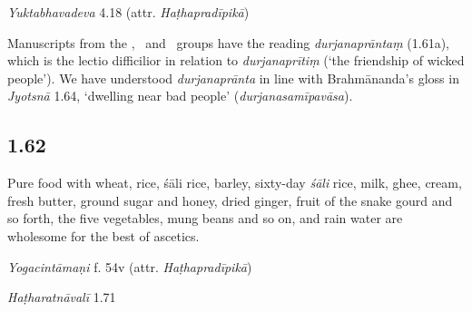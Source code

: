 \begin{ekdosis}
\begin{testimonia}[hp01_061]
\emph{Yuktabhavadeva} 4.18 (attr. \emph{Haṭhapradīpikā})
\begin{versinnote}
\end{versinnote}

\end{testimonia}

\begin{philcomm}[hp01_061]
Manuscripts from the \textalpha, \textbeta\ and \textepsilon\ groups have the reading \emph{durjanaprāntaṃ} (1.61a), which is the lectio difficilior in relation to \emph{durjanaprītiṃ} (`the friendship of wicked people'). We have understood \emph{durjanaprānta} in line with Brahmānanda's gloss in \emph{Jyotsnā} 1.64, `dwelling near bad people' (\emph{durjanasamīpavāsa}).  
\end{philcomm}

\subsection*{1.62}
\begin{translation}[hp01_062]
Pure food with wheat, rice, śāli rice, barley, sixty-day \emph{śāli} rice, milk, ghee, cream, fresh butter, ground sugar and honey, dried ginger, fruit of the snake gourd and so forth, the five vegetables, mung beans and so on, and rain water are wholesome for the best of ascetics.%
\end{translation}


\begin{testimonia}[hp01_062]
\emph{Yogacintāmaṇi} f. 54v (attr. \emph{Haṭhapradīpikā})

\begin{versinnote}
\end{versinnote}

\emph{Haṭharatnāvalī} 1.71


\end{testimonia}
\end{ekdosis}
